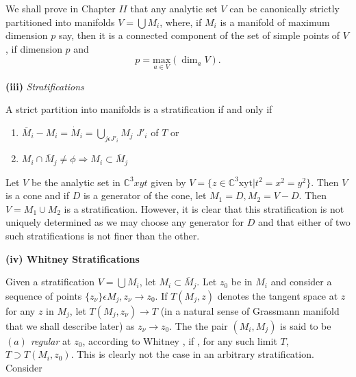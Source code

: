 We shall prove in Chapter $II$ that any analytic set $V$ can be
canonically strictly partitioned into manifolds $V = \bigcup M_i$, 
where, if $M_i$ is a manifold of maximum  dimension $p$ say, then it
is a connected  component of  the set of simple points of $V$, if
dimension $p $ and 
$$
p =  \underset{a \in V}{\text{max}}  (\dim _a
V).
$$ 

{\bf (iii)}  \textit{Stratifications}\pageoriginale

\begin{definition}\label{chap1-defin11}  %
  A strict partition into manifolds is a stratification  if and only if 
  \begin{enumerate}[1.]
  \item  $\overline{M}_{i} - M_{i} = \dot{M}_i  =  \bigcup \limits _{j
    \epsilon J'_{i}}  M_{j} $ 
    $J'_{i}$ of $T$ or 

  \item $M_{i} \cap \overline{M}_{j} \neq \phi  \Rightarrow  M_{i}
    \subset  \overline{M}_{j}$ 
  \end{enumerate}
\end{definition}

\begin{examples}\label{chap1-exams1}  %
  Let $V$  be the  analytic set in    $\mathbb{C}^3  xyt$ given by
  $V=\big\{z \in \mathbb{C}^3 \text{xyt} \big| t^2
  =x^2=y^2\big\}$. Then $V$  is a cone and if $D$ is a generator of
  the  cone, let $M_{1} = D, M_{2} = V-D$. Then $V= M_1 \cup M_2$ is a
  stratification. 
  However, it is clear that this stratification is not uniquely
  determined as we may choose any generator for $D$  and that either
  of two such  stratifications is not  finer than the other. 
\end{examples}

{\bf (iv)  Whitney  Stratifications}

Given a stratification $V = \bigcup M_i$, let $M_i \subset
\overline{M}_j$. Let $z_0$ be in $M_i$ and consider a sequence of
points $\{z_\nu \} \epsilon  M_j, z_\nu \rightarrow z_0$. If
$T(M_j,z)$ denotes  the tangent space  at $z$ for any $z$ in $M_j$,
let 
$T(M_j,z_\nu) \rightarrow T $ (in a  natural sense of  Grassmann
manifold that  we shall  describe  later) as $z_\nu \rightarrow
z_0$. The  the pair $(M_i, M_j)$ is said to be \textit{$(a)$ regular}
at $z_0$, according to Whitney , if , for any such limit $T$, 
$T \supset T (M_i,z_0)$. This is clearly not  the case in an arbitrary
stratification. Consider 

